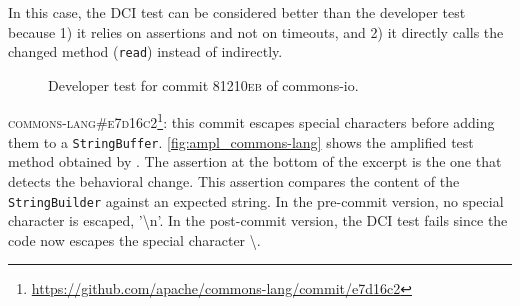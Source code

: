 In this case, the DCI test can be considered better than the developer test because
1) it relies on assertions and not on timeouts, and
2) it directly calls the changed method (\texttt{read}) instead of indirectly. 

\begin{figure}[h]
\centering
{}
\caption{Developer test for commit \textsc{81210eb} of commons-io.}
\label{fig:diff_commons-io}
\end{figure}


\textsc{commons-lang\#e7d16c2}\footnote{\url{https://github.com/apache/commons-lang/commit/e7d16c2}}: this commit escapes special characters before adding them to a \texttt{StringBuffer}.
\autoref{fig:ampl_commons-lang} shows the amplified test method obtained by \DCII.
The assertion at the bottom of the excerpt is the one that detects the behavioral change.
This assertion compares the content of the \texttt{StringBuilder} against an expected string.
In the pre-commit version, no special character is escaped, \eg '\textbackslash n'.
In the post-commit version, the DCI test fails since the code now escapes the special character \textbackslash.

